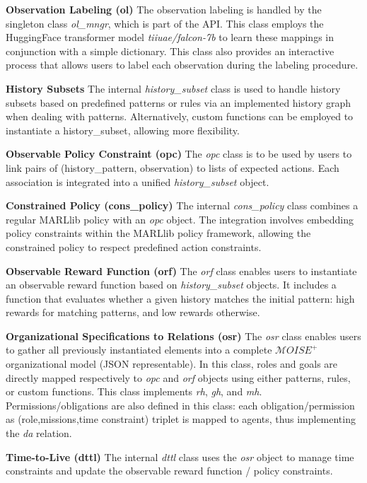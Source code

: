 \documentclass[runningheads]{llncs}
\theoremstyle{freethm}
\theoremstyle{proofoutline}
\newcounter{relation}
\begin{document}
\textbf{Observation Labeling (ol)} \quad The observation labeling is handled by the singleton class \textit{ol\_mngr}, which is part of the API. This class employs the HuggingFace transformer model \textit{tiiuae/falcon-7b} to learn these mappings in conjunction with a simple dictionary. This class also provides an interactive process that allows users to label each observation during the labeling procedure.

\textbf{History Subsets} \quad The internal \textit{history\_subset} class is used to handle history subsets based on predefined patterns or rules via an implemented history graph when dealing with patterns. Alternatively, custom functions can be employed to instantiate a history\_subset, allowing more flexibility.

\textbf{Observable Policy Constraint (opc)} \quad The \textit{opc} class is to be used by users to link pairs of (history\_pattern, observation) to lists of expected actions. Each association is integrated into a unified \textit{history\_subset} object.

\textbf{Constrained Policy (cons\_policy)} \quad The internal \textit{cons\_policy} class combines a regular MARLlib policy with an \textit{opc} object. The integration involves embedding policy constraints within the MARLlib policy framework, allowing the constrained policy to respect predefined action constraints.

\textbf{Observable Reward Function (orf)} \quad The \textit{orf} class enables users to instantiate an observable reward function based on \textit{history\_subset} objects. It includes a function that evaluates whether a given history matches the initial pattern: high rewards for matching patterns, and low rewards otherwise.

\textbf{Organizational Specifications to Relations (osr)} \quad The \textit{osr} class enables users to gather all previously instantiated elements into a complete $\mathcal{M}OISE^+$ organizational model (JSON representable). In this class, roles and goals are directly mapped respectively to \textit{opc} and \textit{orf} objects using either patterns, rules, or custom functions. This class implements \textit{rh}, \textit{gh}, and \textit{mh}. Permissions/obligations are also defined in this class: each obligation/permission as (role,missions,time constraint) triplet is mapped to agents, thus implementing the \textit{da} relation.

\textbf{Time-to-Live (dttl)} \quad The internal \textit{dttl} class uses the \textit{osr} object to manage time constraints and update the observable reward function / policy constraints.
\end{document}
